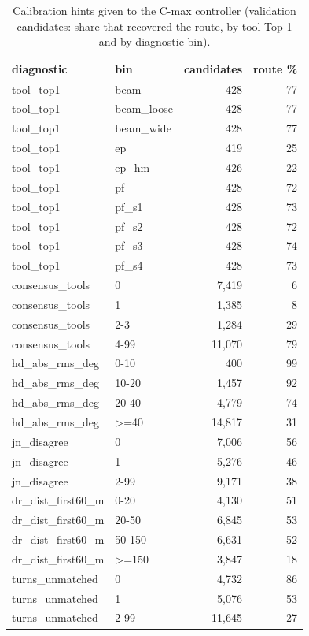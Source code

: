 \begin{table}[H]\centering\scriptsize\setlength{\tabcolsep}{3pt}
\caption{Calibration hints given to the C-max controller (validation candidates: share that recovered the route, by tool Top-1 and by diagnostic bin).}\label{tab:supp_agent_hints}
\begin{tabular}{llrr}\toprule
diagnostic & bin & candidates & route \% \\\midrule
tool\_top1 & beam & 428 & 77 \\
tool\_top1 & beam\_loose & 428 & 77 \\
tool\_top1 & beam\_wide & 428 & 77 \\
tool\_top1 & ep & 419 & 25 \\
tool\_top1 & ep\_hm & 426 & 22 \\
tool\_top1 & pf & 428 & 72 \\
tool\_top1 & pf\_s1 & 428 & 73 \\
tool\_top1 & pf\_s2 & 428 & 72 \\
tool\_top1 & pf\_s3 & 428 & 74 \\
tool\_top1 & pf\_s4 & 428 & 73 \\
consensus\_tools & 0 & 7{,}419 & 6 \\
consensus\_tools & 1 & 1{,}385 & 8 \\
consensus\_tools & 2-3 & 1{,}284 & 29 \\
consensus\_tools & 4-99 & 11{,}070 & 79 \\
hd\_abs\_rms\_deg & 0-10 & 400 & 99 \\
hd\_abs\_rms\_deg & 10-20 & 1{,}457 & 92 \\
hd\_abs\_rms\_deg & 20-40 & 4{,}779 & 74 \\
hd\_abs\_rms\_deg & >=40 & 14{,}817 & 31 \\
jn\_disagree & 0 & 7{,}006 & 56 \\
jn\_disagree & 1 & 5{,}276 & 46 \\
jn\_disagree & 2-99 & 9{,}171 & 38 \\
dr\_dist\_first60\_m & 0-20 & 4{,}130 & 51 \\
dr\_dist\_first60\_m & 20-50 & 6{,}845 & 53 \\
dr\_dist\_first60\_m & 50-150 & 6{,}631 & 52 \\
dr\_dist\_first60\_m & >=150 & 3{,}847 & 18 \\
turns\_unmatched & 0 & 4{,}732 & 86 \\
turns\_unmatched & 1 & 5{,}076 & 53 \\
turns\_unmatched & 2-99 & 11{,}645 & 27 \\
\bottomrule\end{tabular}
\end{table}
